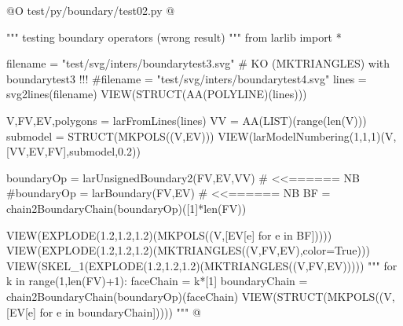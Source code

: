 \documentclass[11pt,oneside]{article}    %
\begin{document}
@O test/py/boundary/test02.py
@{""" testing boundary operators (wrong result) """
from larlib import *

filename = "test/svg/inters/boundarytest3.svg" # KO (MKTRIANGLES) with boundarytest3 !!!
#filename = "test/svg/inters/boundarytest4.svg"
lines = svg2lines(filename)
VIEW(STRUCT(AA(POLYLINE)(lines)))
    
V,FV,EV,polygons = larFromLines(lines)
VV = AA(LIST)(range(len(V)))
submodel = STRUCT(MKPOLS((V,EV)))
VIEW(larModelNumbering(1,1,1)(V,[VV,EV,FV],submodel,0.2))

boundaryOp = larUnsignedBoundary2(FV,EV,VV)  # <<======  NB
#boundaryOp = larBoundary(FV,EV)  # <<======  NB
BF = chain2BoundaryChain(boundaryOp)([1]*len(FV))

VIEW(EXPLODE(1.2,1.2,1.2)(MKPOLS((V,[EV[e] for e in BF])))) 
VIEW(EXPLODE(1.2,1.2,1.2)(MKTRIANGLES((V,FV,EV),color=True))) 
VIEW(SKEL_1(EXPLODE(1.2,1.2,1.2)(MKTRIANGLES((V,FV,EV))))) 
"""
for k in range(1,len(FV)+1):
    faceChain = k*[1]
    boundaryChain = chain2BoundaryChain(boundaryOp)(faceChain)
    VIEW(STRUCT(MKPOLS((V,[EV[e] for e in boundaryChain]))))
"""
@}
\end{document}
